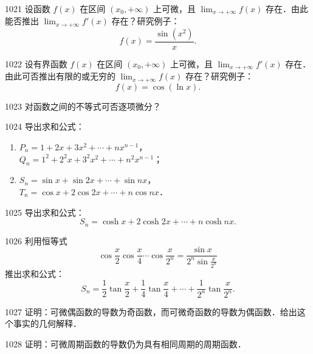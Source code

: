 \begin{prob}[M]{1021}
设函数 $f(x)$ 在区间 $(x_0, +\infty)$ 上可微，且 $\lim_{x \to +\infty} f(x)$ 存在．由此能否推出 $\lim_{x \to +\infty} f'(x)$ 存在？研究例子：
\[
f(x) = \frac{\sin(x^2)}{x}.
\]
\end{prob}

\begin{prob}[M]{1022}
设有界函数 $f(x)$ 在区间 $(x_0, +\infty)$ 上可微，且 $\lim_{x \to +\infty} f'(x)$ 存在．由此可否推出有限的或无穷的 $\lim_{x \to +\infty} f(x)$ 存在？研究例子：
\[
f(x) = \cos(\ln x).
\]
\end{prob}

\begin{prob}[S]{1023}
对函数之间的不等式可否逐项微分？
\end{prob}

\begin{prob}[L]{1024}
导出求和公式：
\begin{enumerate}[label=(\alph*), itemsep=2pt, topsep=3pt]
  \item $P_n = 1 + 2x + 3x^2 + \cdots + nx^{n-1}$，\\
  $Q_n = 1^2 + 2^2 x + 3^2 x^2 + \cdots + n^2 x^{n-1}$；
  \item $S_n = \sin x + \sin 2x + \cdots + \sin nx$，\\
  $T_n = \cos x + 2\cos 2x + \cdots + n\cos nx$．
\end{enumerate}
\end{prob}

\begin{prob}[M]{1025}
导出求和公式：
\[
S_n = \cosh x + 2\cosh 2x + \cdots + n\cosh nx.
\]
\end{prob}

\begin{prob}[M]{1026}
利用恒等式
\[
\cos \frac{x}{2} \cos \frac{x}{4} \cdots \cos \frac{x}{2^n} = \frac{\sin x}{2^n \sin \frac{x}{2^n}}
\]
推出求和公式：
\[
S_n = \frac{1}{2} \tan \frac{x}{2} + \frac{1}{4} \tan \frac{x}{4} + \cdots + \frac{1}{2^n} \tan \frac{x}{2^n}.
\]
\end{prob}

\begin{prob}[M]{1027}
证明：可微偶函数的导数为奇函数，而可微奇函数的导数为偶函数．给出这个事实的几何解释．
\end{prob}

\begin{prob}[M]{1028}
证明：可微周期函数的导数仍为具有相同周期的周期函数．
\end{prob}

